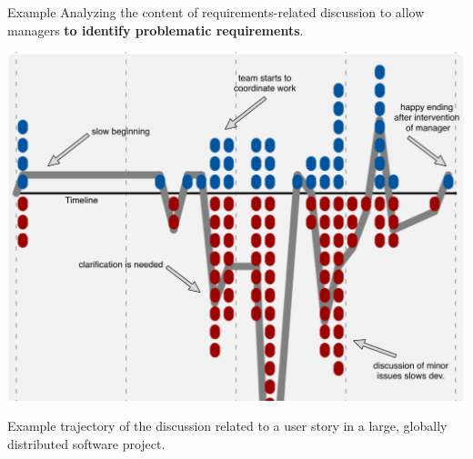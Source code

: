 \documentclass[final]{beamer} %
\newcommand{\marker}[1]{\textbf{\color{knaccentcolor1} #1}}
\begin{document}
\begin{frame}{}
\begin{columns}[t]
\begin{column}{.45\linewidth}
    

    \begin{block}{Example}
    Analyzing the content of requirements-related discussion to allow managers \marker{to identify problematic requirements}.
\begin{center}
\includegraphics[viewport=0 0 625 475,clip=true,width=0.95\linewidth]{img/bike-shed-example}\\
\end{center}


Example trajectory of the discussion related to a user story in a large, globally distributed software project. 
    \end{block}
   


\end{column}
\end{columns}
\end{frame}
\end{document}
